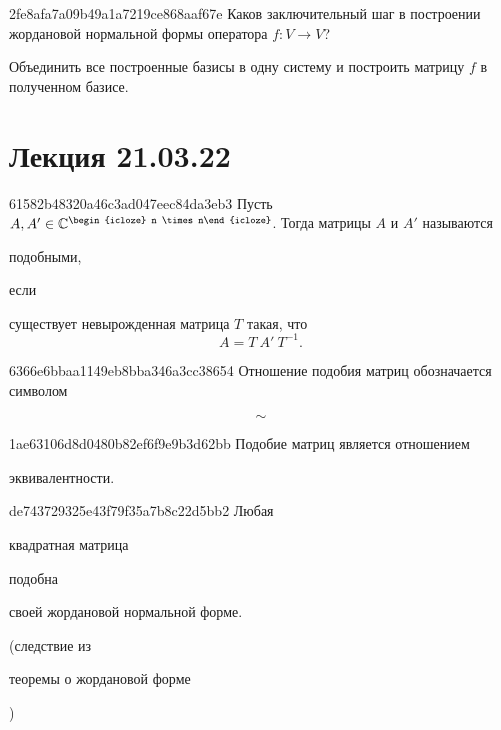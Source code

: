 \begin{note}{2fe8afa7a09b49a1a7219ce868aaf67e}
    Каков заключительный шаг в построении жордановой нормальной формы оператора \( f : V \to V \)?

    \begin{cloze}{1}
        Объединить все построенные базисы в одну систему и построить матрицу \( f \) в полученном базисе.
    \end{cloze}
\end{note}

\section{Лекция 21.03.22}
\begin{note}{61582b48320a46c3ad047eec84da3eb3}
    Пусть \( A, A' \in \mathbb C^{\begin{icloze}{3}n \times n\end{icloze}} \). Тогда матрицы \( A \) и \( A' \) называются \begin{icloze}{2}подобными,\end{icloze} если \begin{icloze}{1}существует невырожденная матрица \( T \) такая, что
    \[
        A = T \: A' \: T^{-1}.
    \]\end{icloze}
\end{note}

\begin{note}{6366e6bbaa1149eb8bba346a3cc38654}
    Отношение подобия матриц обозначается символом
    \begin{icloze}{1}
        \[
            \sim
        \]
    \end{icloze}
\end{note}

\begin{note}{1ae63106d8d0480b82ef6f9e9b3d62bb}
    Подобие матриц является отношением \begin{icloze}{1}эквивалентности.\end{icloze}
\end{note}

\begin{note}{de743729325e43f79f35a7b8c22d5bb2}
    Любая \begin{icloze}{2}квадратная матрица\end{icloze} подобна \begin{icloze}{1}своей жордановой нормальной форме.\end{icloze}

    \begin{center}
        \tiny (следствие из \begin{icloze}{3}теоремы о жордановой форме\end{icloze})
    \end{center}
\end{note}

